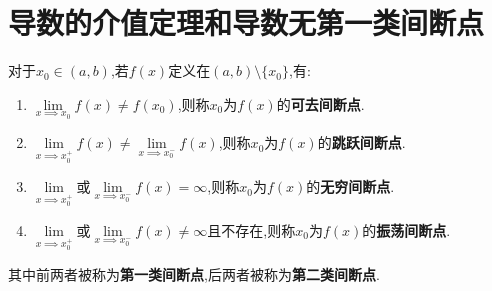 \documentclass[UTF8]{book}
\begin{document}
    \section{导数的介值定理和导数无第一类间断点}
    对于$x_0\in (a,b)$,若$f(x)$定义在$(a,b)\setminus \{x_0\}$,有:\begin{enumerate}
        \item $\lim\limits_{x\implies x_0}f(x)\neq f(x_0)$,则称$x_0$为$f(x)$的\textbf{可去间断点}.
        \item $\lim\limits_{x\implies x_0^+} f(x)\neq \lim\limits_{x\implies x_0^-}f(x)$,则称$x_0$为$f(x)$的\textbf{跳跃间断点}.
        \item $\lim\limits_{x\implies x_0^+}$或$\lim\limits_{x\implies x_0^-} f(x)=\infty$,则称$x_0$为$f(x)$的\textbf{无穷间断点}.
        \item $\lim\limits_{x\implies x_0^+}$或$\lim\limits_{x\implies x_0^-} f(x)\neq \infty$且不存在,则称$x_0$为$f(x)$的\textbf{振荡间断点}.
    \end{enumerate}
    其中前两者被称为\textbf{第一类间断点},后两者被称为\textbf{第二类间断点}.
\end{document}
